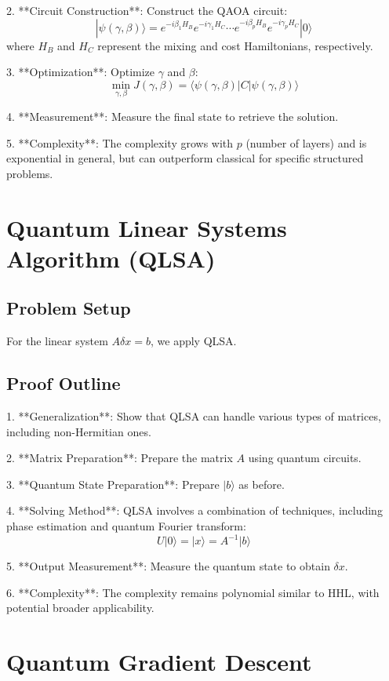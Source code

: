 \documentclass{article}
\begin{document}
2. **Circuit Construction**: Construct the QAOA circuit:
   \[
   |\psi(\gamma, \beta)\rangle = e^{-i \beta_1 H_B} e^{-i \gamma_1 H_C} \cdots e^{-i \beta_p H_B} e^{-i \gamma_p H_C} |0\rangle
   \]
   where \( H_B \) and \( H_C \) represent the mixing and cost Hamiltonians, respectively.

3. **Optimization**: Optimize \( \gamma \) and \( \beta \):
   \[
   \min_{\gamma, \beta} J(\gamma, \beta) = \langle \psi(\gamma, \beta) | C | \psi(\gamma, \beta) \rangle
   \]

4. **Measurement**: Measure the final state to retrieve the solution.

5. **Complexity**: The complexity grows with \( p \) (number of layers) and is exponential in general, but can outperform classical for specific structured problems.


\section{Quantum Linear Systems Algorithm (QLSA)}

\subsection{Problem Setup}

For the linear system \( A \delta x = b \), we apply QLSA.

\subsection{Proof Outline}

1. **Generalization**: Show that QLSA can handle various types of matrices, including non-Hermitian ones.

2. **Matrix Preparation**: Prepare the matrix \( A \) using quantum circuits.

3. **Quantum State Preparation**: Prepare \( |b\rangle \) as before.

4. **Solving Method**: QLSA involves a combination of techniques, including phase estimation and quantum Fourier transform:
   \[
   U |0\rangle = |x\rangle = A^{-1}|b\rangle
   \]

5. **Output Measurement**: Measure the quantum state to obtain \( \delta x \).

6. **Complexity**: The complexity remains polynomial similar to HHL, with potential broader applicability.


\section{Quantum Gradient Descent}
\end{document}
